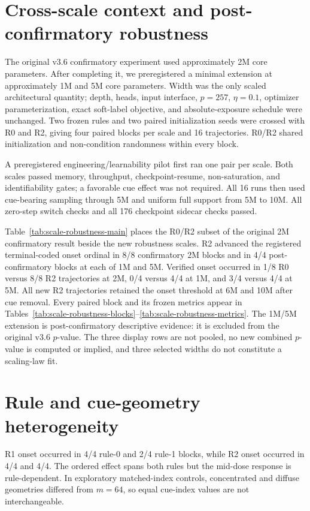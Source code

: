 \documentclass{article}
\begin{document}
\section{Cross-scale context and post-confirmatory robustness}
The original v3.6 confirmatory experiment used approximately 2M core
parameters. After completing it, we preregistered a minimal extension at
approximately 1M and 5M core parameters. Width was the only scaled architectural quantity;
depth, heads, input interface, $p=257$, $\eta=0.1$, optimizer
parameterization, exact soft-label objective, and absolute-exposure schedule
were unchanged. Two frozen rules and two paired initialization seeds were
crossed with R0 and R2, giving four paired blocks per scale and 16 trajectories.
R0/R2 shared initialization and non-condition randomness within every block.

A preregistered engineering/learnability pilot first ran one pair per scale.
Both scales passed memory, throughput, checkpoint-resume, non-saturation, and
identifiability gates; a favorable cue effect was not required. All 16 runs
then used cue-bearing sampling through 5M and uniform full support from 5M to
10M. All zero-step switch checks and all 176 checkpoint sidecar checks passed.

Table~\ref{tab:scale-robustness-main} places the R0/R2 subset of the original
2M confirmatory result beside the new robustness scales. R2 advanced the
registered terminal-coded onset ordinal in 8/8 confirmatory 2M blocks and in
4/4 post-confirmatory blocks at each of 1M and 5M. Verified onset occurred in
1/8 R0 versus 8/8 R2 trajectories at 2M, 0/4 versus 4/4 at 1M, and 3/4 versus
4/4 at 5M. All new R2 trajectories retained the onset threshold at 6M and 10M
after cue removal.
Every paired block and its frozen metrics appear in
Tables~\ref{tab:scale-robustness-blocks}--\ref{tab:scale-robustness-metrics}.
The 1M/5M extension is post-confirmatory descriptive evidence: it is excluded
from the original v3.6 $p$-value. The three display rows are not pooled, no new
combined $p$-value is computed or implied, and three selected widths do not
constitute a scaling-law fit.



\section{Rule and cue-geometry heterogeneity}
R1 onset occurred in 4/4 rule-0 and 2/4 rule-1
blocks, while R2 onset occurred in 4/4 and 4/4.
The ordered effect spans both rules but the mid-dose response is
rule-dependent. In exploratory matched-index controls, concentrated and
diffuse geometries differed from $m=64$, so equal cue-index values are not
interchangeable.
\end{document}
